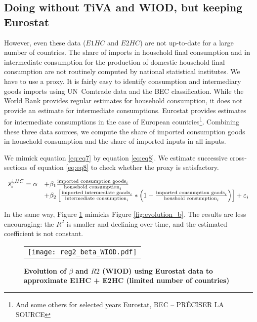 \documentclass[11pt,a4paper]{article}
\begin{document}
\subsection{Doing without TiVA and WIOD, but keeping Eurostat}
However, even these data ($E1HC$ and $E2HC$) are not up-to-date for a large number of countries. 
The share of imports in household final consumption and in intermediate consumption for the production of domestic household final consumption are not routinely computed by national statistical institutes. 
We have to use a proxy. It is fairly easy to identify consumption and intermediary goods imports using UN Comtrade data and the BEC classification. 
While the World Bank provides regular estimates for household consumption, it does not provide an estimate for intermediate consumptions. Eurostat provides estimates for intermediate consumptions in the case of European countries\footnote{And some others for selected years Eurostat, BEC -- PRÉCISER LA SOURCE}. 
Combining these three data sources, we compute the share of imported consumption goods in household consumption and the share of imported inputs in all inputs. 

We mimick equation \ref{eq:eq7} by equation \ref{eq:eq8}. 
We estimate successive cross-sections of equation \ref{eq:eq8} to check whether the proxy is satisfactory. 

 \begin{equation}
 \begin{array}{llll}
\overline{s}_{i}^{i,HC}= \alpha &+  \beta_1  \frac{\textnormal{imported consumption goods}_i}{\textnormal{household consumption}_i} \\ & +  \beta_2  \left[    \frac{\textnormal{imported intermediate goods}_i}{\textnormal{intermediate consumption}_i}*\left(1-\frac{\textnormal{imported consumption goods}_i}{\textnormal{houshold consumption}_i}\right)\right] +\varepsilon_i 
\end{array} 
\label{eq:eq8}
\end{equation}


In the same way, Figure \ref{fig:evolution_b_reg2} mimicks Figure \ref{fig:evolution_b}. 
The results are less encouraging: the $R^2$ is smaller and declining over time, and the estimated coefficient is not constant.


\begin{figure}[!h]
	\centering
	\caption{\footnotesize{\textbf{Evolution of $\beta$ and $R2$ (WIOD) using Eurostat data to approximate E1HC + E2HC (limited number of countries)}}}
	\begin{tabular}{c}
		\texttt{[image: reg2\_beta\_WIOD.pdf]}\\
	\end{tabular}
	\label{fig:evolution_b_reg2}
\end{figure}
\end{document}
